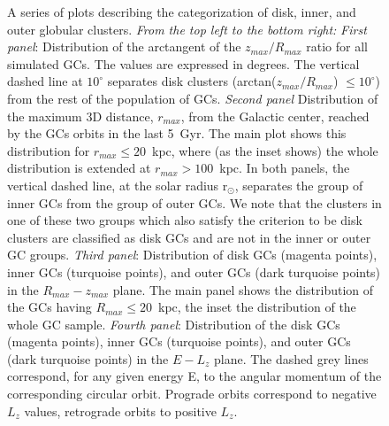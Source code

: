 \begin{figure}
\begin{center}
                \caption[A series of plots describing the categorization of disk, inner, and outer globular clusters]{ A series of plots describing the categorization of disk, inner, and outer globular clusters. \emph{From the top left to the bottom right:} \emph{First panel}: Distribution of the arctangent of the $z_{max}/R_{max}$ ratio for all simulated GCs. The values are expressed in degrees. The vertical dashed line at $10^\circ$ separates disk clusters (arctan($z_{max}/R_{max}$) $\le 10^\circ$) from the rest of the population of GCs. \emph{Second panel} Distribution of the maximum 3D distance, $r_{max}$, from the Galactic center, reached by the GCs orbits in the last 5~Gyr. The main plot shows this distribution for $r_{max} \le 20$~kpc, where (as the inset shows) the whole distribution is extended at $r_{max} > 100$~kpc.  In both panels, the vertical dashed line, at the solar radius r$_{\odot}$, separates the group of inner GCs from the group of outer GCs. We note that the clusters in one of these two groups which also satisfy the criterion to be disk clusters are classified as disk GCs and are not in the inner or outer GC groups. \emph{Third panel}: Distribution of disk GCs (magenta points), inner GCs (turquoise points), and outer GCs (dark turquoise points) in the $R_{max}-z_{max}$  plane. The main panel shows the distribution of the GCs having $R_{max} \le 20$~kpc, the inset  the distribution of the whole GC sample. \emph{Fourth panel}: Distribution of the disk GCs (magenta points), inner GCs (turquoise points), and outer GCs (dark turquoise points) in the $E-L_z$ plane. The dashed grey lines correspond, for any given energy E, to the angular momentum of the corresponding circular orbit. Prograde orbits correspond to negative $L_z$ values, retrograde orbits to positive $L_z$.
                }\label{orbparam}
            \end{center}
        \end{figure}
        \onecolumn        


